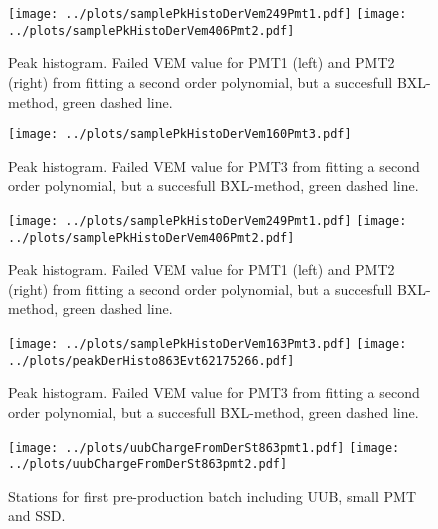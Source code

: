 \documentclass[twoside, final, 10pt]{articleMine}
\begin{document}
\begin{figure}[!tbh]
  \centering
  \subfigure
  {
    \texttt{[image: ../plots/samplePkHistoDerVem249Pmt1.pdf]}
    \texttt{[image: ../plots/samplePkHistoDerVem406Pmt2.pdf]}
  }
  \caption{Peak histogram. Failed VEM value for PMT1 (left) and
  PMT2 (right) from fitting a second order polynomial, but a
  succesfull BXL-method, green dashed line.}
  \label{figPkSampleFailFitGoodDerpmt12}
\end{figure}

\begin{figure}[!tbh]
  \centering
  \subfigure
  {
    \texttt{[image: ../plots/samplePkHistoDerVem160Pmt3.pdf]}
  }
  \caption{Peak histogram. Failed VEM value for PMT3 from fitting
  a second order polynomial, but a succesfull BXL-method, green
  dashed line.}
  \label{figPkSampleFailFitGoodDerpmt3}
\end{figure}
\clearpage

\begin{figure}[!tbh]
  \centering
  \subfigure
  {
    \texttt{[image: ../plots/samplePkHistoDerVem249Pmt1.pdf]}
    \texttt{[image: ../plots/samplePkHistoDerVem406Pmt2.pdf]}
  }
  \caption{Peak histogram. Failed VEM value for PMT1 (left) and
  PMT2 (right) from fitting a second order polynomial, but a
  succesfull BXL-method, green dashed line.}
  \label{figPkSampleFailFitDerpmt12}
\end{figure}

\begin{figure}[!tbh]
  \centering
  \subfigure
  {
    \texttt{[image: ../plots/samplePkHistoDerVem163Pmt3.pdf]}
    \texttt{[image: ../plots/peakDerHisto863Evt62175266.pdf]}
  }
  \caption{Peak histogram. Failed VEM value for PMT3 from fitting
  a second order polynomial, but a succesfull BXL-method, green
  dashed line.}
  \label{figPkSampleFailFitDerpmt3}
\end{figure}
\clearpage


\begin{figure}[!tbh]
  \centering
  \subfigure
  {
    \texttt{[image: ../plots/uubChargeFromDerSt863pmt1.pdf]}
    \texttt{[image: ../plots/uubChargeFromDerSt863pmt2.pdf]}
  }
  \caption{Stations for first pre-production batch including UUB, small PMT and SSD.}
  \label{figChVemCompFitDerTimePmt1}
\end{figure}
\end{document}

